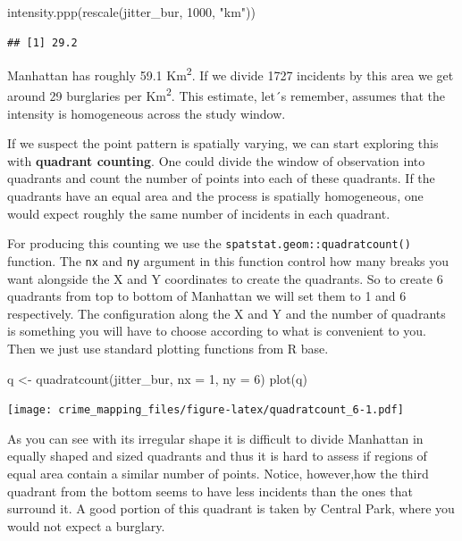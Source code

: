 \documentclass[
  krantz2]{krantz}
\makeatletter
\newenvironment{Shaded}{\begin{snugshade}}{\end{snugshade}}
\newcommand{\AttributeTok}[1]{\textcolor[rgb]{0.61,0.61,0.61}{#1}}
\newcommand{\DecValTok}[1]{\textcolor[rgb]{0.06,0.06,0.06}{#1}}
\newcommand{\FunctionTok}[1]{\textcolor[rgb]{0,0,0}{#1}}
\newcommand{\NormalTok}[1]{#1}
\newcommand{\OtherTok}[1]{\textcolor[rgb]{0.37,0.37,0.37}{#1}}
\newcommand{\StringTok}[1]{\textcolor[rgb]{0.5,0.5,0.5}{#1}}
\newenvironment{kframe}{%
\medskip{}
\setlength{\fboxsep}{.8em}
 \def\at@end@of@kframe{}%
 \ifinner\ifhmode%
  \def\at@end@of@kframe{\end{minipage}}%
  \begin{minipage}{\columnwidth}%
 \fi\fi%
 \def\FrameCommand##1{\hskip\@totalleftmargin \hskip-\fboxsep
 \colorbox{shadecolor}{##1}\hskip-\fboxsep
     \hskip-\linewidth \hskip-\@totalleftmargin \hskip\columnwidth}%
 \MakeFramed {\advance\hsize-\width
   \@totalleftmargin\z@ \linewidth\hsize
   \@setminipage}}%
 {\par\unskip\endMakeFramed%
 \at@end@of@kframe}
\renewenvironment{Shaded}{\begin{kframe}}{\end{kframe}}
\makeatother
\begin{document}
\begin{Shaded}
\begin{Highlighting}[]
\FunctionTok{intensity.ppp}\NormalTok{(}\FunctionTok{rescale}\NormalTok{(jitter\_bur, }\DecValTok{1000}\NormalTok{, }\StringTok{"km"}\NormalTok{))}
\end{Highlighting}
\end{Shaded}

\begin{verbatim}
## [1] 29.2
\end{verbatim}

Manhattan has roughly 59.1 Km\textsuperscript{2}. If we divide 1727 incidents by this area we get around 29 burglaries per Km\textsuperscript{2}. This estimate, let´s remember, assumes that the intensity is homogeneous across the study window.

If we suspect the point pattern is spatially varying, we can start exploring this with \textbf{quadrant counting}. One could divide the window of observation into quadrants and count the number of points into each of these quadrants. If the quadrants have an equal area and the process is spatially homogeneous, one would expect roughly the same number of incidents in each quadrant.

For producing this counting we use the \texttt{spatstat.geom::quadratcount()} function. The \texttt{nx} and \texttt{ny} argument in this function control how many breaks you want alongside the X and Y coordinates to create the quadrants. So to create 6 quadrants from top to bottom of Manhattan we will set them to 1 and 6 respectively. The configuration along the X and Y and the number of quadrants is something you will have to choose according to what is convenient to you. Then we just use standard plotting functions from R base.

\begin{Shaded}
\begin{Highlighting}[]
\NormalTok{q }\OtherTok{\textless{}{-}} \FunctionTok{quadratcount}\NormalTok{(jitter\_bur, }\AttributeTok{nx =} \DecValTok{1}\NormalTok{, }\AttributeTok{ny =} \DecValTok{6}\NormalTok{)}
\FunctionTok{plot}\NormalTok{(q)}
\end{Highlighting}
\end{Shaded}

\texttt{[image: crime\_mapping\_files/figure-latex/quadratcount\_6-1.pdf]}

As you can see with its irregular shape it is difficult to divide Manhattan in equally shaped and sized quadrants and thus it is hard to assess if regions of equal area contain a similar number of points. Notice, however,how the third quadrant from the bottom seems to have less incidents than the ones that surround it. A good portion of this quadrant is taken by Central Park, where you would not expect a burglary.
\end{document}
